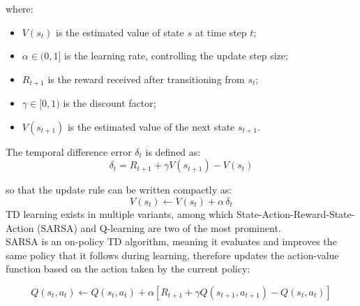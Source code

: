 \documentclass[12pt,a4paper]{report}
\begin{document}
\noindent where:
\begin{itemize}
    \item $V(s_t)$ is the estimated value of state $s$ at time step $t$;
    \item $\alpha \in (0,1]$ is the learning rate, controlling the update step size;
    \item $R_{t+1}$ is the reward received after transitioning from $s_t$;
    \item $\gamma \in [0,1)$ is the discount factor;
    \item $V(s_{t+1})$ is the estimated value of the next state $s_{t+1}$.
\end{itemize}

\noindent The temporal difference error $\delta_t$ is defined as:
\[
\delta_t = R_{t+1} + \gamma V(s_{t+1}) - V(s_t)
\]

\noindent so that the update rule can be written compactly as:
\[
V(s_t) \leftarrow V(s_t) + \alpha \, \delta_t
\]
TD learning exists in multiple variants, among which 
State-Action-Reward-State-Action (SARSA) and Q-learning are two of the most prominent. \\
SARSA is an on-policy TD algorithm, meaning it evaluates and improves the same policy that it follows during learning, therefore updates the action-value function based on the action taken by the current policy:

\[
Q(s_t, a_t) \leftarrow Q(s_t, a_t) + \alpha\left[R_{t+1} + \gamma 
Q(s_{t+1}, a_{t+1}) - Q(s_t, a_t)\right]
\]
\end{document}
